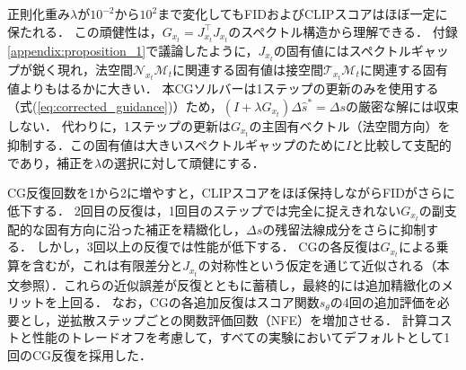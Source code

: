 \documentclass[MIRU,submit]{miru2026j}
\theoremstyle{definition}
\newcommand{\gM}{{\mathcal{M}}}
\newcommand{\gN}{{\mathcal{N}}}
\newcommand{\gT}{{\mathcal{T}}}
\begin{document}
正則化重み$\lambda$が$10^{-2}$から$10^{2}$まで変化してもFIDおよびCLIPスコアはほぼ一定に保たれる．
この頑健性は，$G_{x_t}=J_{x_t}^\top J_{x_t}$のスペクトル構造から理解できる．
付録\ref{appendix:proposition_1}で議論したように，$J_{x_t}$の固有値にはスペクトルギャップが鋭く現れ，法空間$\gN_{x_t}\gM_t$に関連する固有値は接空間$\gT_{x_t}\gM_t$に関連する固有値よりもはるかに大きい．
本CGソルバーは1ステップの更新のみを使用する（式(\ref{eq:corrected_guidance})）ため，$(I+\lambda G_{x_t})\Delta\hat{s}^*=\Delta s$の厳密な解には収束しない．
代わりに，1ステップの更新は$G_{x_t}$の主固有ベクトル（法空間方向）を抑制する．この固有値は大きいスペクトルギャップのために$I$と比較して支配的であり，補正を$\lambda$の選択に対して頑健にする．

CG反復回数を1から2に増やすと，CLIPスコアをほぼ保持しながらFIDがさらに低下する．
2回目の反復は，1回目のステップでは完全に捉えきれない$G_{x_t}$の副支配的な固有方向に沿った補正を精緻化し，$\Delta s$の残留法線成分をさらに抑制する．
しかし，3回以上の反復では性能が低下する．
CGの各反復は$G_{x_t}$による乗算を含むが，これは有限差分と$J_{x_t}$の対称性という仮定を通じて近似される（本文参照）．これらの近似誤差が反復とともに蓄積し，最終的には追加精緻化のメリットを上回る．
なお，CGの各追加反復はスコア関数$s_\theta$の4回の追加評価を必要とし，逆拡散ステップごとの関数評価回数（NFE）を増加させる．
計算コストと性能のトレードオフを考慮して，すべての実験においてデフォルトとして1回のCG反復を採用した．
\end{document}
